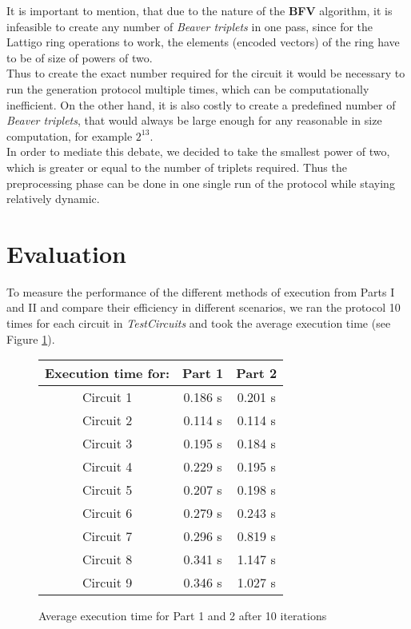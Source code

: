 \documentclass[10pt,conference,compsocconf]{IEEEtran}
\begin{document}
It is important to mention, that due to the nature of the \textbf{BFV} algorithm, it is infeasible to create any number of \textit{Beaver triplets} in one pass, since for the Lattigo ring operations to work, the elements (encoded vectors) of the ring have to be of size of powers of two.\\
Thus to create the exact number required for the circuit it would be necessary to run the generation protocol multiple times, which can be computationally inefficient. On the other hand, it is also costly to create a predefined number of \textit{Beaver triplets}, that would always be large enough for any reasonable in size computation, for example $2^{13}$. \\
In order to mediate this debate, we decided to take the smallest power of two, which is greater or equal to the number of triplets required. Thus the preprocessing phase can be done in one single run of the protocol while staying relatively dynamic.


\section{Evaluation}
To measure the performance of the different methods of execution from Parts I and II and compare their efficiency in different scenarios, we ran the protocol 10 times for each circuit in \textit{TestCircuits} and took the average execution time (see Figure \ref{table}).\\

\begin{figure}
\centering
  \begin{tabular}{||c|c|c||}
  \hline
  \multicolumn{1}{||c|}{Execution time for:}&{Part 1}&{Part 2}\\
  \hline
  Circuit 1 & 0.186 s & 0.201 s\\
  Circuit 2 & 0.114 s & 0.114 s\\
  Circuit 3 & 0.195 s & 0.184 s\\
  Circuit 4 & 0.229 s & 0.195 s\\
  Circuit 5 & 0.207 s & 0.198 s\\
  Circuit 6 & 0.279 s & 0.243 s\\
  Circuit 7 & 0.296 s & 0.819 s\\
  Circuit 8 & 0.341 s & 1.147 s\\
  Circuit 9 & 0.346 s & 1.027 s\\
  \hline
  \end{tabular}
\caption{Average execution time for Part 1 and 2 after 10 iterations}
\label{table}
\end{figure}
\end{document}
